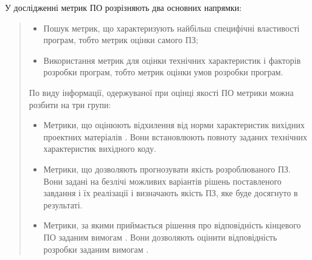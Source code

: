 У дослідженні метрик ПО розрізняють два основних напрямки:
\begin{quote}
\begin{itemize}
\item {} 
Пошук метрик, що характеризують найбільш специфічні властивості програм, тобто метрик оцінки самого ПЗ;

\item {} 
Використання метрик для оцінки технічних характеристик і факторів розробки програм, тобто метрик оцінки умов розробки програм.

\end{itemize}

По виду інформації, одержуваної при оцінці якості ПО метрики можна розбити на три групи:
\begin{itemize}
\item {} 
Метрики, що оцінюють відхилення від норми характеристик вихідних проектних матеріалів . Вони встановлюють повноту заданих технічних характеристик вихідного коду.

\item {} 
Метрики, що дозволяють прогнозувати якість розроблюваного ПЗ. Вони задані на безлічі можливих варіантів рішень поставленого завдання і їх реалізації і визначають якість ПЗ, яке буде досягнуто в результаті.

\item {} 
Метрики, за якими приймається рішення про відповідність кінцевого ПО заданим вимогам . Вони дозволяють оцінити відповідність розробки заданим вимогам .

\end{itemize}
\end{quote}


